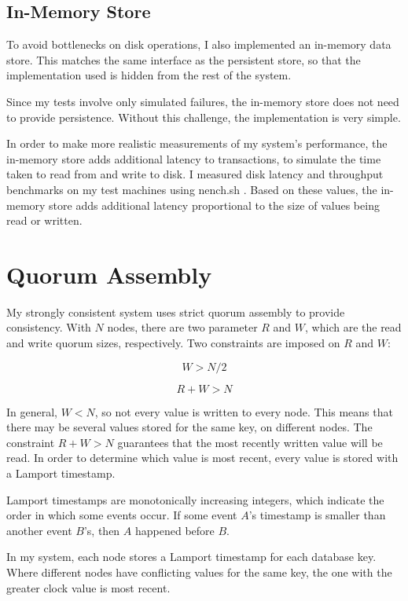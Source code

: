 \documentclass[12pt,a4paper,twoside,openany]{report}
\begin{document}
\subsection{In-Memory Store}

To avoid bottlenecks on disk operations, I also implemented an in-memory data store. This matches the same interface as the persistent store, so that the implementation used is hidden from the rest of the system.

Since my tests involve only simulated failures, the in-memory store does not need to provide persistence. Without this challenge, the implementation is very simple.

In order to make more realistic measurements of my system's performance, the in-memory store adds additional latency to transactions, to simulate the time taken to read from and write to disk. I measured disk latency and throughput benchmarks on my test machines using nench.sh \cite{nench}. Based on these values, the in-memory store adds additional latency proportional to the size of values being read or written.

\section{Quorum Assembly}

My strongly consistent system uses strict quorum assembly to provide consistency. With $N$ nodes, there are two parameter $R$ and $W$, which are the read and write quorum sizes, respectively. Two constraints are imposed on $R$ and $W$:

$$W > N / 2$$

$$R + W > N$$

In general, $W < N$, so not every value is written to every node. This means that there may be several values stored for the same key, on different nodes. The constraint $R + W > N$ guarantees that the most recently written value will be read. In order to determine which value is most recent, every value is stored with a Lamport timestamp.

Lamport timestamps are monotonically increasing integers, which indicate the order in which some events occur. If some event $A$'s timestamp is smaller than another event $B$'s, then $A$ happened before $B$.

In my system, each node stores a Lamport timestamp for each database key. Where different nodes have conflicting values for the same key, the one with the greater clock value is most recent.
\end{document}
